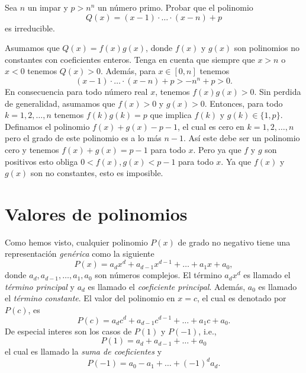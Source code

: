 \begin{example}
    Sea $n$ un impar y $p > n^n$ un número primo.
    Probar que el polinomio
    \[
        Q(x) = (x - 1)\cdot \ldots \cdot (x - n) + p
    \]
    es irreducible.
\end{example}
\begin{solution}
    Asumamos que $Q(x) = f(x) g(x)$, donde $f(x)$ y $g(x)$ son polinomios no constantes con coeficientes enteros.
    Tenga en cuenta que siempre que $x > n$ o $x < 0$ tenemos $Q(x) > 0$.
    Además, para $x \in \left[0, n\right]$ tenemos
    \[
        (x - 1)\cdot \ldots \cdot (x - n) + p > -n^n + p > 0.
    \]
    En consecuencia para todo número real $x$, tenemos $f(x) g(x) > 0$.
    Sin perdida de generalidad, asumamos que $f(x) > 0$ y $g(x) > 0$.
    Entonces, para todo $k = 1, 2, \ldots, n$ tenemos $f(k) g(k) = p$ que implica $f(k)$ y $g(k) \in \{1, p\}$.
    Definamos el polinomio $f(x) + g(x) - p - 1$, el cual es cero en $k = 1,2, \ldots, n$ pero el grado de este polinomio es a lo más $n - 1$.
    Así este debe ser un polinomio cero y tenemos $f(x) + g(x) = p - 1$ para todo $x$.
    Pero ya que $f$ y $g$ son positivos esto obliga $0 < f(x), g(x) < p - 1$ para todo $x$.
    Ya que $f(x)$ y $g(x)$ son no constantes, esto es imposible.
\end{solution}





\section{Valores de polinomios}

Como hemos visto, cualquier polinomio $P(x)$ de grado no negativo tiene una representación \textit{genérica} como la siguiente
\[
    P(x) = a_d x^d + a_{d - 1} x^{d - 1} + \ldots + a_1 x + a_0,
\]
donde $a_d, a_{d - 1}, \ldots, a_1, a_0$ son números complejos.
El término $a_d x^d$ es llamado el \textit{término principal}  y $a_d$ es llamado el \textit{coeficiente principal}.
Además, $a_0$ es llamado el \textit{término constante}.
El valor del polinomio en $x = c$, el cual es denotado por $P(c)$, es
\[
    P(c) = a_d c^d + a_{d - 1}c^{d - 1} + \ldots + a_1 c + a_0.
\]
De especial interes son los casos de $P(1)$ y $P(-1)$, i.e.,
\[
    P(1) = a_d + a_{d - 1} + \ldots + a_0
\]
el cual es llamado la \textit{suma de coeficientes} y
\[
    P(-1) = a_0 - a_1 + \ldots + (-1)^d a_d.
\]


